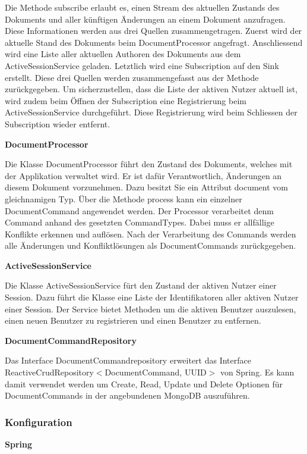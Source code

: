 Die Methode subscribe erlaubt es, einen Stream des aktuellen Zustands des Dokuments und aller künftigen Änderungen an einem Dokument anzufragen.
Diese Informationen werden aus drei Quellen zusammengetragen.
Zuerst wird der aktuelle Stand des Dokuments beim DocumentProcessor angefragt.
Anschliessend wird eine Liste aller aktuellen Authoren des Dokuments aus dem ActiveSessionService geladen.
Letztlich wird eine Subscription auf den Sink erstellt.
Diese drei Quellen werden zusammengefasst aus der Methode zurückgegeben.
Um sicherzustellen, dass die Liste der aktiven Nutzer aktuell ist, wird zudem beim Öffnen der Subscription eine Registrierung beim ActiveSessionService durchgeführt.
Diese Registrierung wird beim Schliessen der Subscription wieder entfernt.

\textbf{DocumentProcessor}

Die Klasse DocumentProcessor führt den Zustand des Dokuments, welches mit der Applikation verwaltet wird.
Er ist dafür Verantwortlich, Änderungen an diesem Dokument vorzunehmen.
Dazu besitzt Sie ein Attribut document vom gleichnamigen Typ.
Über die Methode process kann ein einzelner DocumentCommand angewendet werden.
Der Processor verarbeitet denm Command anhand des gesetzten CommandTypes.
Dabei muss er allfällige Konflikte erkennen und auflösen.
Nach der Verarbeitung des Commands werden alle Änderungen und Konfliktlösungen als DocumentCommands zurückgegeben.

\textbf{ActiveSessionService}

Die Klasse ActiveSessionService fürt den Zustand der aktiven Nutzer einer Session.
Dazu führt die Klasse eine Liste der Identifikatoren aller aktiven Nutzer einer Session.
Der Service bietet Methoden um die aktiven Benutzer auszulesen, einen neuen Benutzer zu registrieren und einen Benutzer zu entfernen.

\textbf{DocumentCommandRepository}

Das Interface DocumentCommandrepository erweitert das Interface ReactiveCrudRepository$<$DocumentCommand, UUID$>$ von Spring.
Es kann damit verwendet werden um Create, Read, Update und Delete Optionen für DocumentCommands in der angebundenen MongoDB auszuführen.

\clearpage

\subsubsection{Konfiguration}

\textbf{Spring}

